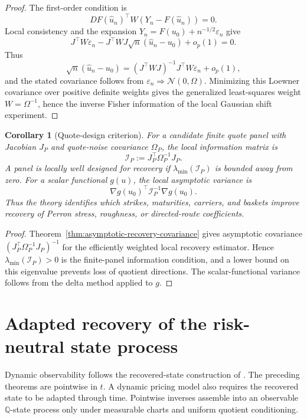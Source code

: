 \documentclass[11pt,a4paper]{amsart}
\theoremstyle{plain}
\newtheorem{corollary}[theorem]{Corollary}
\theoremstyle{definition}
\theoremstyle{remark}
\newcommand{\QQ}{\mathbb{Q}}
\newcommand{\eps}{\varepsilon}
\begin{document}
\begin{proof}
The first-order condition is
\[
        DF(\widehat u_n)^\top W(Y_n-F(\widehat u_n))=0.
\]
Local consistency and the expansion \(Y_n=F(u_0)+n^{-1/2}\eps_n\) give
\[
        J^\top W\eps_n
        -
        J^\top WJ\sqrt n(\widehat u_n-u_0)
        +o_p(1)=0.
\]
Thus
\[
        \sqrt n(\widehat u_n-u_0)
        =
        (J^\top WJ)^{-1}J^\top W\eps_n+o_p(1),
\]
and the stated covariance follows from \(\eps_n\Rightarrow\mathcal N(0,\Omega)\).  Minimizing this
Loewner covariance over positive definite weights gives the generalized least-squares weight
\(W=\Omega^{-1}\), hence the inverse Fisher information of the local Gaussian shift experiment.
\end{proof}

\begin{corollary}[Quote-design criterion]\label{cor:quote-design}
For a candidate finite quote panel with Jacobian \(J_P\) and quote-noise covariance
\(\Omega_P\), the local information matrix is
\[
        \mathcal I_P:=J_P^\top\Omega_P^{-1}J_P.
\]
A panel is locally well designed for recovery if \(\lambda_{\min}(\mathcal I_P)\) is bounded
away from zero.  For a scalar functional \(g(u)\), the local asymptotic variance is
\[
        \nabla g(u_0)^\top\mathcal I_P^{-1}\nabla g(u_0).
\]
Thus the theory identifies which strikes, maturities, carriers, and baskets improve recovery of
Perron stress, roughness, or directed-route coefficients.
\end{corollary}

\begin{proof}
Theorem~\ref{thm:asymptotic-recovery-covariance} gives asymptotic covariance
\((J_P^\top\Omega_P^{-1}J_P)^{-1}\) for the efficiently weighted local recovery estimator.  Hence
\(\lambda_{\min}(\mathcal I_P)>0\) is the finite-panel information condition, and a lower bound on
this eigenvalue prevents loss of quotient directions.  The scalar-functional variance follows from
the delta method applied to \(g\).
\end{proof}


\section{Adapted recovery of the risk-neutral state process}\label{sec:dynamic-recovery}

Dynamic observability follows the recovered-state construction of \cite{vidal2026dynamic}.  The
preceding theorems are pointwise in \(t\).  A dynamic pricing model also requires the recovered
state to be adapted through time.  Pointwise inverses assemble into an observable \(\QQ\)-state
process only under measurable charts and uniform quotient conditioning.
\end{document}
